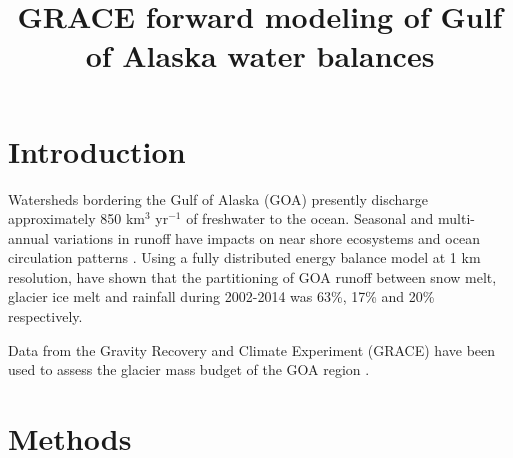 \documentclass[review,oneside]{igs}
\begin{document}
\title[GRACE Forward Modeling]{GRACE forward modeling of Gulf of Alaska water balances}

\author[Arendt and others]{ }



\maketitle

\section{Introduction}

Watersheds bordering the Gulf of Alaska (GOA) presently discharge approximately 850 km$^3$ yr$^{-1}$ \citep{hill_spatial_2015} of freshwater to the ocean. Seasonal and multi-annual variations in runoff have impacts on near shore ecosystems and ocean circulation patterns \citep{oneel_icefield--ocean_2015}. Using a fully distributed energy balance model at 1 km resolution, \cite{beamer_high-resolution_2016} have shown that the partitioning of GOA runoff between snow melt, glacier ice melt and rainfall during 2002-2014 was 63\%, 17\% and 20\% respectively. 

Data from the Gravity Recovery and Climate Experiment (GRACE) have been used to assess the glacier mass budget of the GOA region \citep{sasgen_towards_2012,schrama_mascon_2014,reager_decade_2016,harig_ice_2016}.  

\section{Methods}
\end{document}
